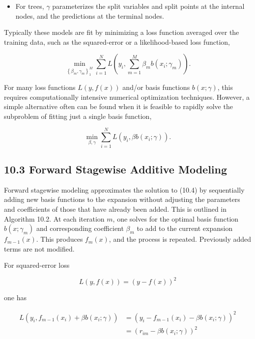 \documentclass[10pt]{article}
\begin{document}
\begin{itemize}
  \item For trees, $\gamma$ parameterizes the split variables and split points at the internal nodes, and the predictions at the terminal nodes.
\end{itemize}

Typically these models are fit by minimizing a loss function averaged over the training data, such as the squared-error or a likelihood-based loss function,


\begin{equation*}
\min _{\left\{\beta_{m}, \gamma_{m}\right\}_{1}^{M}} \sum_{i=1}^{N} L\left(y_{i}, \sum_{m=1}^{M} \beta_{m} b\left(x_{i} ; \gamma_{m}\right)\right) . \tag{10.4}
\end{equation*}


For many loss functions $L(y, f(x))$ and/or basis functions $b(x ; \gamma)$, this requires computationally intensive numerical optimization techniques. However, a simple alternative often can be found when it is feasible to rapidly solve the subproblem of fitting just a single basis function,


\begin{equation*}
\min _{\beta, \gamma} \sum_{i=1}^{N} L\left(y_{i}, \beta b\left(x_{i} ; \gamma\right)\right) . \tag{10.5}
\end{equation*}


\subsection*{10.3 Forward Stagewise Additive Modeling}
Forward stagewise modeling approximates the solution to (10.4) by sequentially adding new basis functions to the expansion without adjusting the parameters and coefficients of those that have already been added. This is outlined in Algorithm 10.2. At each iteration $m$, one solves for the optimal basis function $b\left(x ; \gamma_{m}\right)$ and corresponding coefficient $\beta_{m}$ to add to the current expansion $f_{m-1}(x)$. This produces $f_{m}(x)$, and the process is repeated. Previously added terms are not modified.

For squared-error loss


\begin{equation*}
L(y, f(x))=(y-f(x))^{2} \tag{10.6}
\end{equation*}


one has


\begin{align*}
L\left(y_{i}, f_{m-1}\left(x_{i}\right)+\beta b\left(x_{i} ; \gamma\right)\right) & =\left(y_{i}-f_{m-1}\left(x_{i}\right)-\beta b\left(x_{i} ; \gamma\right)\right)^{2} \\
& =\left(r_{i m}-\beta b\left(x_{i} ; \gamma\right)\right)^{2} \tag{10.7}
\end{align*}
\end{document}
